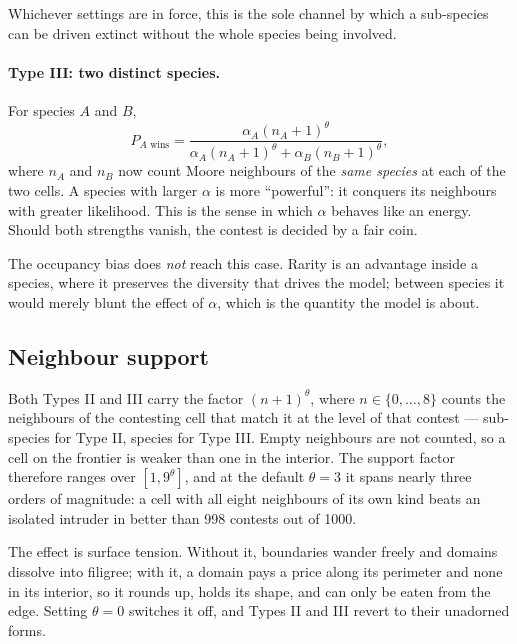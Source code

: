 \documentclass[11pt,a4paper]{article}
\begin{document}
Whichever settings are in force, this is the sole channel by which a sub-species can be
driven extinct without the whole species being involved.

\paragraph{Type III: two distinct species.}
For species $A$ and $B$,
\begin{equation}
  P_{A \text{ wins}} = \frac{\alpha_A (n_A+1)^{\theta}}
                            {\alpha_A (n_A+1)^{\theta} + \alpha_B (n_B+1)^{\theta}},
  \label{eq:typeIII}
\end{equation}
where $n_A$ and $n_B$ now count Moore neighbours of the \emph{same species} at each of
the two cells. A species with larger $\alpha$ is more ``powerful'': it conquers its
neighbours with greater likelihood. This is the sense in which $\alpha$ behaves like an
energy. Should both strengths vanish, the contest is decided by a fair coin.

The occupancy bias does \emph{not} reach this case. Rarity is an advantage inside a
species, where it preserves the diversity that drives the model; between species it would
merely blunt the effect of $\alpha$, which is the quantity the model is about.

\subsection{Neighbour support}

Both Types II and III carry the factor $(n+1)^{\theta}$, where $n \in \{0,\dots,8\}$
counts the neighbours of the contesting cell that match it at the level of that contest
--- sub-species for Type II, species for Type III. Empty neighbours are not counted, so a
cell on the frontier is weaker than one in the interior. The support factor therefore
ranges over $[1, 9^{\theta}]$, and at the default $\theta = 3$ it spans nearly three orders of
magnitude: a cell with all eight neighbours of its own kind beats an isolated intruder
in better than 998 contests out of 1000.

The effect is surface tension. Without it, boundaries wander freely and domains dissolve
into filigree; with it, a domain pays a price along its perimeter and none in its
interior, so it rounds up, holds its shape, and can only be eaten from the edge. Setting
$\theta = 0$ switches it off, and Types II and III revert to their unadorned forms.
\end{document}
